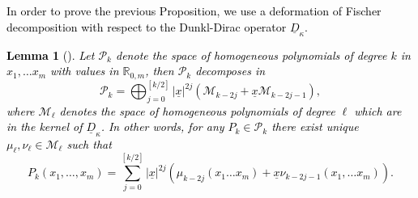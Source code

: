 \documentclass{amsart}
\newtheorem{lemma}[theorem]{Lemma}
\theoremstyle{definition}
\theoremstyle{remark}
\numberwithin{equation}{section}
\begin{document}
\textcolor{black}{In order to prove the previous Proposition, we use a deformation of Fischer decomposition with respect to the Dunkl-Dirac operator $\underline{D}_{\kappa}$.
\begin{lemma}[\cite{oss}]\label{Dunkl-Dirac Fischer decomposition}
Let $\mathcal{P}_k$ denote the space of homogeneous polynomials of degree $k$ in $x_1,\dots x_m$ with values in $\mathbb{R}_{0,m}$, then $\mathcal{P}_k$ decomposes in
\begin{equation*}
\mathcal{P}_k=\bigoplus_{j=0}^{[k/2]}|\underline{x}|^{2j}\left(\mathcal{M}_{k-2j}+\underline{x}\mathcal{M}_{k-2j-1}\right),
\end{equation*}
where $\mathcal{M}_\ell$ denotes the space of homogeneous polynomials of degree $\ell$ which are in the kernel of $\underline{D}_{\kappa}$.
In other words, for any $P_k\in\mathcal{P}_k$ there exist unique $\mu_\ell,\nu_\ell\in\mathcal{M}_\ell$ such that
\begin{equation*}
P_k(x_1,\dots,x_m)=\sum_{j=0}^{[k/2]}|\underline{x}|^{2j}\left(\mu_{k-2j}(x_1\dots x_m)+\underline{x}\nu_{k-2j-1}(x_1,\dots x_m)\right).
\end{equation*}
\end{lemma}}
\end{document}
